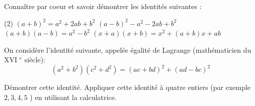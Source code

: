 \documentclass[a4paper,12pt]{report}
\begin{document}
\vspace*{-2\baselineskip}
\begin{acti}
Connaître par coeur et savoir démontrer les identités suivantes :
\begin{tasks}(2)
\task $(a+b)^2=a^2+2 a b+b^2$
\task $(a-b)^2-a^2-2 a b+b^2$
\task $(a+b)(a-b)=a^2-b^2$
\task $(x+a)(x+b)=x^2+(a+b) x+a b$
\end{tasks}
\end{acti}
\begin{acti}	
On considère l'identité suivante, appelée égalité de Lagrange (mathématicien du XVI ${ }^e$ siècle):
\[
\left(a^2+b^2\right)\left(c^2+d^2\right)=(a c+b d)^2+(a d-b c)^2
\]
\begin{tasks}
\task Démontrer cette identité.
\task Appliquer cette identité à quatre entiers (par exemple $2,3,4,5$ ) en utilisant la calculatrice.
\end{tasks}
\end{acti}
\end{document}
